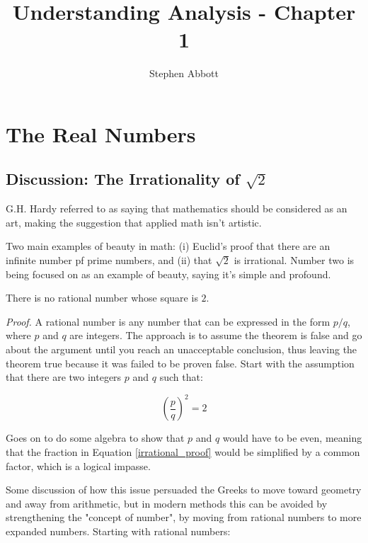 \documentclass{article}
\numberwithin{equation}{subsection}
\numberwithin{theo}{subsection}
\begin{document}
\title{Understanding Analysis - Chapter 1}

\author{Stephen Abbott}
\maketitle

\section{The Real Numbers}
\subsection{Discussion: The Irrationality of $\sqrt{2}$}
G.H. Hardy referred to as saying that mathematics should be considered as an
art, making the suggestion that applied math isn't artistic.

Two main examples of beauty in math: (i) Euclid's proof that there are an
infinite number pf prime numbers, and (ii) that $\sqrt{2}$ is irrational. Number
two is being focused on as an example of beauty, saying it's simple and
profound.

\begin{theo}
    \label{sqtwo}
    There is no rational number whose square is $2$.
\end{theo}

\emph{Proof.} A rational number is any number that can be expressed in the form
$p/q$, where $p$ and $q$ are integers. The approach is to assume the theorem is
false and go about the argument until you reach an unacceptable conclusion, thus
leaving the theorem true because it was failed to be proven false. Start with
the assumption that there are two integers $p$ and $q$ such that:

\begin{equation}\label{irrational_proof}
    \left(\frac{p}{q}\right)^{2} = 2
\end{equation}

Goes on to do some algebra to show that $p$ and $q$ would have to be even,
meaning that the fraction in Equation \ref{irrational_proof} would be simplified by a
common factor, which is a logical impasse. 

Some discussion of how this issue persuaded the Greeks to move toward geometry
and away from arithmetic, but in modern methods this can be avoided by
strengthening the "concept of number", by moving from rational numbers to more
expanded numbers. Starting with rational numbers:
\end{document}
